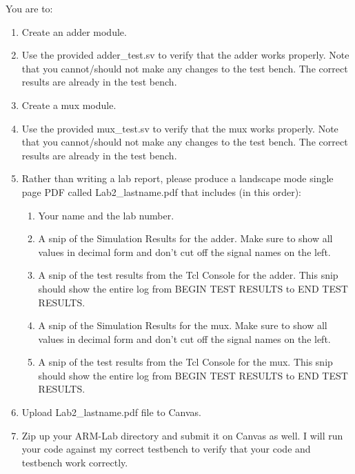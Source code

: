 You are to:
\begin{enumerate}
\item Create an adder module.
\item Use the provided adder\_test.sv to verify that the adder works properly.  Note that you cannot/should not make any changes to the test bench.  The correct results are already in the test bench.	
\item Create a mux module.
\item Use the provided mux\_test.sv to verify that the mux works properly.  Note that you cannot/should not make any changes to the test bench.  The correct results are already in the test bench.	
\item Rather than writing a lab report, please produce a landscape mode single page PDF called Lab2\_lastname.pdf that includes (in this order):
\begin{enumerate}
	\item Your name and the lab number.
	\item A snip of the Simulation Results for the adder.  Make sure to show all values in decimal form and don't cut off the signal names on the left.  
	\item A snip of the test results from the Tcl Console for the adder.  This snip should show the entire log from BEGIN TEST RESULTS to END TEST RESULTS.
	\item A snip of the Simulation Results for the mux.  Make sure to show all values in decimal form and don't cut off the signal names on the left.  
	\item A snip of the test results from the Tcl Console for the mux.  This snip should show the entire log from BEGIN TEST RESULTS to END TEST RESULTS.	
\end{enumerate}
\item Upload Lab2\_lastname.pdf file to Canvas.
\item Zip up your ARM-Lab directory and submit it on Canvas as well.  I will run your code against my correct testbench to verify that your code and testbench work correctly. 
\end{enumerate} 